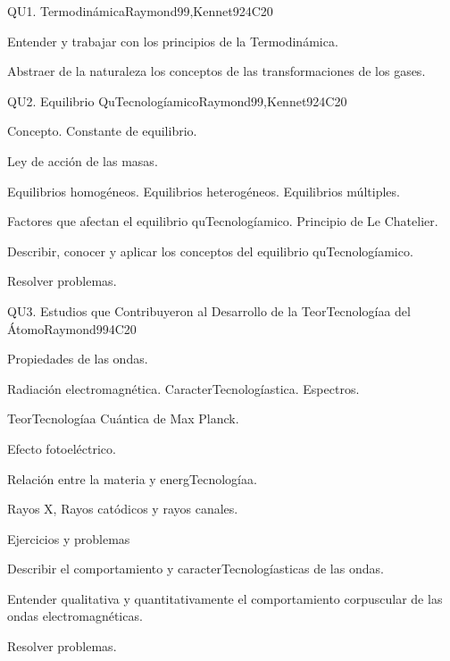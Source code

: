 \begin{syllabus}
\begin{unit}{QU1. Termodinámica}{}{Raymond99,Kennet92}{4}{C20}
   \begin{learningoutcomes}
      \item Entender y trabajar con los principios de la Termodinámica.
      \item Abstraer de la naturaleza los conceptos de las transformaciones de los gases.
   \end{learningoutcomes}
\end{unit}

\begin{unit}{QU2. Equilibrio QuTecnologíamico}{}{Raymond99,Kennet92}{4}{C20}
\begin{topics}
      \item Concepto. Constante de equilibrio.
      \item Ley de acción de las masas.
      \item Equilibrios homogéneos. Equilibrios heterogéneos. Equilibrios múltiples.
      \item Factores que afectan el equilibrio quTecnologíamico. Principio de Le Chatelier.
    \end{topics}
   \begin{learningoutcomes}
      \item Describir, conocer y aplicar los conceptos del equilibrio quTecnologíamico.
      \item Resolver problemas.
   \end{learningoutcomes}
\end{unit}

\begin{unit}{QU3. Estudios que Contribuyeron al Desarrollo de la TeorTecnologíaa del Átomo}{}{Raymond99}{4}{C20}
\begin{topics}
      \item Propiedades de las ondas.
      \item Radiación electromagnética. CaracterTecnologíastica. Espectros.
      \item TeorTecnologíaa Cuántica de Max Planck.
      \item Efecto fotoeléctrico.
      \item Relación entre la materia y energTecnologíaa.
      \item Rayos X, Rayos catódicos y rayos canales.
      \item Ejercicios y problemas
\end{topics}

   \begin{learningoutcomes}
      \item Describir el comportamiento y caracterTecnologíasticas de las ondas.
      \item Entender qualitativa y quantitativamente el comportamiento corpuscular de las ondas electromagnéticas.
      \item Resolver problemas.
   \end{learningoutcomes}
\end{unit}


\end{syllabus}
